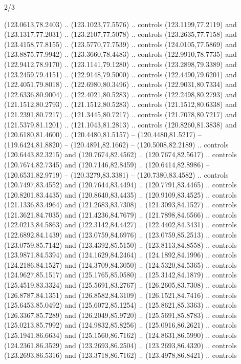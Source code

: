 \begin{flagdescription}{2/3}
\begin{scope}[xshift=0.5\flaglength,yshift=0.5\flagwidth,scale=\flagwidth/180]
\begin{scope}[y=0.8pt, x=0.8pt, yscale=-1,shift={(-168.75,-108.75)}]
  (123.0613,78.2403) .. (123.1023,77.5576) .. controls (123.1199,77.2119) and
  (123.1317,77.2031) .. (123.2107,77.5078) .. controls (123.2635,77.7158) and
  (123.4158,77.8155) .. (123.5770,77.7539) .. controls (124.0105,77.5869) and
  (123.8875,77.9942) .. (123.3660,78.4483) .. controls (122.9910,78.7735) and
  (122.9412,78.9170) .. (123.1141,79.1280) .. controls (123.2898,79.3389) and
  (123.2459,79.4151) .. (122.9148,79.5000) .. controls (122.4490,79.6201) and
  (122.4051,79.8018) .. (122.6980,80.3496) .. controls (122.9031,80.7334) and
  (122.6336,80.9004) .. (122.4021,80.5283) .. controls (122.2498,80.2793) and
  (121.1512,80.2793) .. (121.1512,80.5283) .. controls (121.1512,80.6338) and
  (121.2391,80.7217) .. (121.3445,80.7217) .. controls (121.7078,80.7217) and
  (121.5379,81.1201) .. (121.1043,81.2813) .. controls (120.8260,81.3838) and
  (120.6180,81.4600) .. (120.4480,81.5157) -- (120.4480,81.5217) --
  (119.6424,81.8820) -- (120.4891,82.1662) -- (120.5008,82.2189) .. controls
  (120.6443,82.3215) and (120.7674,82.4562) .. (120.7674,82.5617) .. controls
  (120.7674,82.7345) and (120.7146,82.8459) .. (120.6414,82.8986) --
  (120.6531,82.9719) -- (120.3279,83.3381) -- (120.7380,83.4582) .. controls
  (120.7497,83.4552) and (120.7644,83.4494) .. (120.7791,83.4465) .. controls
  (120.8201,83.4435) and (120.8640,83.4435) .. (120.9109,83.4525) .. controls
  (121.1336,83.4964) and (121.2683,83.7308) .. (121.3093,84.1527) .. controls
  (121.3621,84.7035) and (121.4236,84.7679) .. (121.7898,84.6566) .. controls
  (122.0213,84.5863) and (122.3142,84.4427) .. (122.4402,84.3431) .. controls
  (122.6892,84.1439) and (123.0759,84.6976) .. (123.0759,85.2513) .. controls
  (123.0759,85.7142) and (123.4392,85.5150) .. (123.8113,84.8558) .. controls
  (123.9871,84.5394) and (124.1629,84.2464) .. (124.1892,84.1996) .. controls
  (124.2186,84.1527) and (124.3709,84.3050) .. (124.5320,84.5365) .. controls
  (124.9627,85.1517) and (125.1765,85.0580) .. (125.3142,84.1879) .. controls
  (125.4519,83.3324) and (125.5691,83.2767) .. (126.2605,83.7308) .. controls
  (126.8787,84.1351) and (126.8582,84.3109) .. (126.1521,84.7416) .. controls
  (125.6453,85.0492) and (125.6072,85.1254) .. (125.8621,85.3363) .. controls
  (126.3367,85.7289) and (126.2049,85.9720) .. (125.5691,85.8783) .. controls
  (125.0213,85.7992) and (124.9832,85.8256) .. (125.0916,86.2621) .. controls
  (125.1941,86.6634) and (125.1560,86.7162) .. (124.8631,86.5990) .. controls
  (124.2361,86.3529) and (123.2693,86.2504) .. (123.2693,86.4320) .. controls
  (123.2693,86.5316) and (123.3718,86.7162) .. (123.4978,86.8421) .. controls

\end{scope}
\end{scope}
\end{flagdescription}
